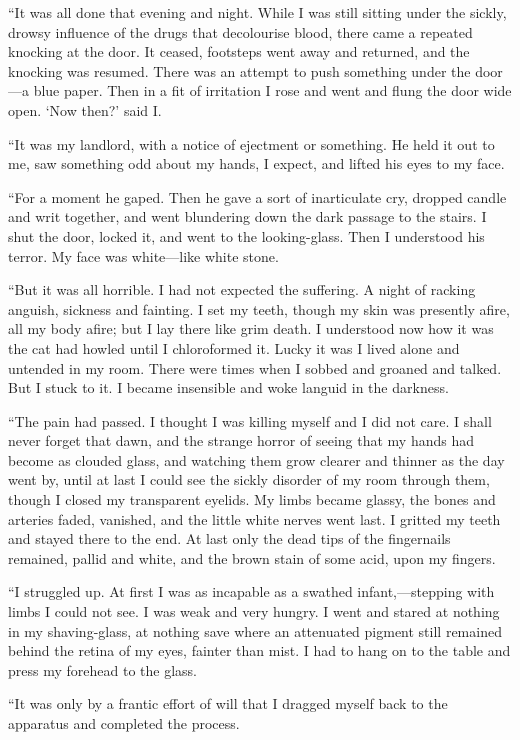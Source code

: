 “It was all done that evening and night. While I was still sitting under the sickly, drowsy influence of the drugs that decolourise blood, there came a repeated knocking at the door. It ceased, footsteps went away and returned, and the knocking was resumed. There was an attempt to push something under the door—a blue paper. Then in a fit of irritation I rose and went and flung the door wide open. ‘Now then?’ said I.

“It was my landlord, with a notice of ejectment or something. He held it out to me, saw something odd about my hands, I expect, and lifted his eyes to my face.

“For a moment he gaped. Then he gave a sort of inarticulate cry, dropped candle and writ together, and went blundering down the dark passage to the stairs. I shut the door, locked it, and went to the looking-glass. Then I understood his terror. My face was white—like white stone.

“But it was all horrible. I had not expected the suffering. A night of racking anguish, sickness and fainting. I set my teeth, though my skin was presently afire, all my body afire; but I lay there like grim death. I understood now how it was the cat had howled until I chloroformed it. Lucky it was I lived alone and untended in my room. There were times when I sobbed and groaned and talked. But I stuck to it. I became insensible and woke languid in the darkness.

“The pain had passed. I thought I was killing myself and I did not care. I shall never forget that dawn, and the strange horror of seeing that my hands had become as clouded glass, and watching them grow clearer and thinner as the day went by, until at last I could see the sickly disorder of my room through them, though I closed my transparent eyelids. My limbs became glassy, the bones and arteries faded, vanished, and the little white nerves went last. I gritted my teeth and stayed there to the end. At last only the dead tips of the fingernails remained, pallid and white, and the brown stain of some acid, upon my fingers.

“I struggled up. At first I was as incapable as a swathed infant,—stepping with limbs I could not see. I was weak and very hungry. I went and stared at nothing in my shaving-glass, at nothing save where an attenuated pigment still remained behind the retina of my eyes, fainter than mist. I had to hang on to the table and press my forehead to the glass.

“It was only by a frantic effort of will that I dragged myself back to the apparatus and completed the process.


